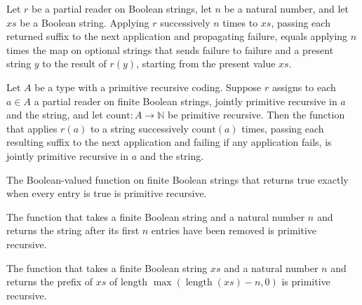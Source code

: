 \begin{lemma}
\label{Turing.codeSkipRepeat_iter}
\leanok
{}
Let $r$ be a partial reader on Boolean strings, let $n$ be a natural number, and let
$xs$ be a Boolean string. Applying $r$ successively $n$ times to $xs$, passing each
returned suffix to the next application and propagating failure, equals applying $n$
times the map on optional strings that sends failure to failure and a present string $y$
to the result of $r(y)$, starting from the present value $xs$.
\end{lemma}

\begin{lemma}
\label{Turing.codePrimRepeat}
\leanok
{}
Let $A$ be a type with a primitive recursive coding. Suppose $r$ assigns to each $a\in
A$ a partial reader on finite Boolean strings, jointly primitive recursive in $a$ and
the string, and let $\mathrm{count}:A\to\mathbb{N}$ be primitive recursive. Then the
function that applies $r(a)$ to a string successively $\mathrm{count}(a)$ times, passing
each resulting suffix to the next application and failing if any application fails, is
jointly primitive recursive in $a$ and the string.
\end{lemma}

\begin{lemma}
\label{Turing.codePrimAll}
\leanok
{}
The Boolean-valued function on finite Boolean strings that returns true exactly when
every entry is true is primitive recursive.
\end{lemma}

\begin{lemma}
\label{Turing.codePrimDrop}
\leanok
{}
The function that takes a finite Boolean string and a natural number $n$ and returns the
string after its first $n$ entries have been removed is primitive recursive.
\end{lemma}

\begin{lemma}
\label{Turing.codePrimPrefix}
\leanok
{}
The function that takes a finite Boolean string $xs$ and a natural number $n$ and
returns the prefix of $xs$ of length $\max(\operatorname{length}(xs)-n,0)$ is primitive
recursive.
\end{lemma}

